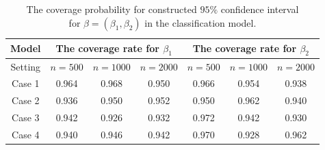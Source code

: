  \begin{table}[tb]
 \centering
\centerfloat
    \caption{The coverage probability for constructed $95\%$ confidence interval\\ for $\beta = (\beta_1,\beta_2)$ in the classification model. }
	\label{tab:simulation4}
	\begin{tabular}{c| ccc|ccc}
 \toprule[1pt]
  Model & \multicolumn{3}{c}{The coverage rate for $\beta_1$} &  \multicolumn{3}{c}{The coverage rate for $\beta_2$}\\
  \hline
 Setting &  $n=500$ &$n=1000$ &$n=2000$&$n=500$ &$n=1000$&$n=2000$ \\
    \midrule[1pt]
    Case 1 & 0.964 & 0.968 & 0.950 & 0.966 & 0.954 & 0.938 \\
    Case 2 & 0.936 & 0.950 & 0.952 & 0.950 & 0.962 & 0.940 \\
    Case 3 & 0.942 & 0.926 & 0.932 & 0.972 & 0.942 & 0.930 \\
    Case 4 & 0.940 & 0.946 & 0.942 & 0.970 & 0.928 & 0.962 \\
    \bottomrule[1pt]
	\end{tabular}
  \end{table}












